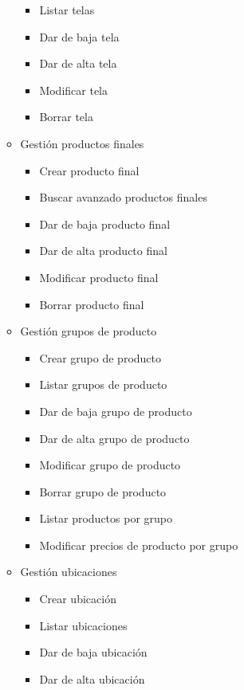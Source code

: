 \begin{itemize}
\begin{itemize}
\begin{itemize}
                \item Listar telas
                \item Dar de baja tela
                \item Dar de alta tela
                \item Modificar tela
                \item Borrar tela
            \end{itemize}
            \item Gestión productos finales
            \begin{itemize}
                \item Crear producto final
                \item Buscar avanzado productos finales
                \item Dar de baja producto final
                \item Dar de alta producto final
                \item Modificar producto final
                \item Borrar producto final
            \end{itemize}
            \item Gestión grupos de producto
            \begin{itemize}
                \item Crear grupo de producto
                \item Listar grupos de producto
                \item Dar de baja grupo de producto
                \item Dar de alta grupo de producto
                \item Modificar grupo de producto
                \item Borrar grupo de producto
                \item Listar productos por grupo
                \item Modificar precios de producto por grupo
            \end{itemize}
            \item Gestión ubicaciones
            \begin{itemize}
                \item Crear ubicación
                \item Listar ubicaciones
                \item Dar de baja ubicación
                \item Dar de alta ubicación

\end{itemize}
\end{itemize}
\end{itemize}
